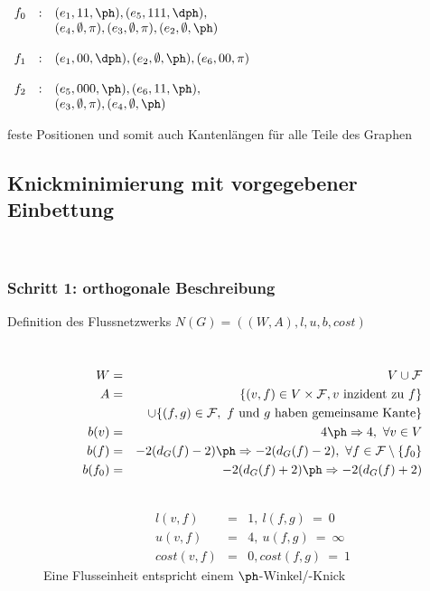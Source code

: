 \begin{description}[itemsep=-1pt]
{\begin{minipage}{0.5\textwidth}
				$\begin{array}{rcl}
					f_0&:&(e_1,11,\ph),(e_5,111,\dph),\\
					&&(e_4,\emptyset,\pi),(e_3,\emptyset,\pi),(e_2,\emptyset,\ph)\\
					&&\\
					f_1&:&(e_1,00,\dph),(e_2,\emptyset,\ph),(e_6,00,\pi)\\
					&&\\
					f_2&:&(e_5,000,\ph),(e_6,11,\ph),\\
					&&(e_3,\emptyset,\pi),(e_4,\emptyset,\ph)
				\end{array}$
			\end{minipage}
		}
	\item[orthogonales Layout] feste Positionen und somit auch Kantenlängen für alle Teile des Graphen
\end{description}
\subsection{Knickminimierung mit vorgegebener Einbettung}
\\
\vspace*{-2\baselineskip}
\subsubsection{Schritt 1: orthogonale Beschreibung}
\begin{description}
	\item[Definition des Flussnetzwerks $N(G)=((W,A),l,u,b,cost)$]\ \\\vspace*{-\baselineskip}
		\begin{eqnarray*}
			W&=&V\cup \mathcal{F}\\
			A&=&\{(v,f)\in V\times \mathcal{F}, v\text{ inzident zu }f\}\\
			&&\cup \{(f,g)\in\mathcal{F},~f\text{ und }g\text{ haben gemeinsame Kante}\}\\
			b(v)&=&4\ph\Rightarrow 4,~\forall v\in V\\
			b(f)&=&-2(d_G(f)-2)\ph\Rightarrow -2(d_G(f)-2),~\forall f\in\mathcal{F}\setminus\{f_0\}\\
			b(f_0)&=&-2(d_G(f)+2)\ph\Rightarrow -2(d_G(f)+2)
		\end{eqnarray*}
\end{description}
\topbreak
\vspace*{-3.5\baselineskip}
\begin{description}
	\item[]\ \\ \begin{eqnarray*}
				l(v,f)&=&1,~l(f,g)~=~0\\
				u(v,f)&=&4,~u(f,g)~=~\infty\\
				cost(v,f) &=&0, cost(f,g)~=~1
			\end{eqnarray*}
		Eine Flusseinheit entspricht einem $\ph$-Winkel/-Knick
\end{description}

